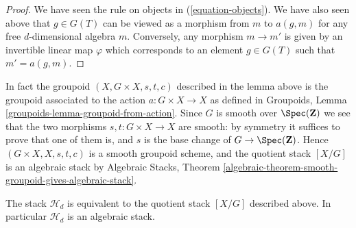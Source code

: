\begin{proof}
We have seen the rule on objects in (\ref{equation-objects}).
We have also seen above that $g \in G(T)$ can be viewed as
a morphism from $m$ to $a(g, m)$ for any free $d$-dimensional algebra $m$.
Conversely, any morphism $m \to m'$ is given by an invertible linear
map $\varphi$ which corresponds to an element $g \in G(T)$ such
that $m' = a(g, m)$.
\end{proof}

\noindent
In fact the groupoid $(X, G \times X, s, t, c)$ described in the
lemma above is the groupoid associated to the action $a : G \times X \to X$
as defined in
Groupoids, Lemma \ref{groupoids-lemma-groupoid-from-action}.
Since $G$ is smooth over $\Spec(\mathbf{Z})$
we see that the two morphisms $s, t : G \times X \to X$ are
smooth: by symmetry it suffices to prove that one of them is, and
$s$ is the base change of $G \to \Spec(\mathbf{Z})$.
Hence $(G \times X, X, s, t, c)$ is a smooth groupoid scheme,
and the quotient stack $[X/G]$ is an algebraic stack by
Algebraic Stacks,
Theorem \ref{algebraic-theorem-smooth-groupoid-gives-algebraic-stack}.

\begin{proposition}
\label{proposition-finite-hilbert-point}
The stack $\mathcal{H}_d$ is equivalent to the quotient stack
$[X/G]$ described above. In particular $\mathcal{H}_d$ is an
algebraic stack.
\end{proposition}


